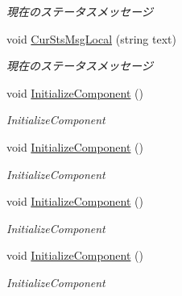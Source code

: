 \begin{DoxyCompactItemize}
\begin{DoxyCompactList}\small\item\em 現在のステータスメッセージ \end{DoxyCompactList}\item 
void \hyperlink{class_reversi_wpf_1_1_main_window_a73402ffecf2de584339327dce357bd60}{Cur\+Sts\+Msg\+Local} (string text)
\begin{DoxyCompactList}\small\item\em 現在のステータスメッセージ \end{DoxyCompactList}\item 
void \hyperlink{class_reversi_wpf_1_1_main_window_a4cf9bc92cee02fa8e3b00fa56fb41c82}{Initialize\+Component} ()
\begin{DoxyCompactList}\small\item\em Initialize\+Component \end{DoxyCompactList}\item 
void \hyperlink{class_reversi_wpf_1_1_main_window_a4cf9bc92cee02fa8e3b00fa56fb41c82}{Initialize\+Component} ()
\begin{DoxyCompactList}\small\item\em Initialize\+Component \end{DoxyCompactList}\item 
void \hyperlink{class_reversi_wpf_1_1_main_window_a4cf9bc92cee02fa8e3b00fa56fb41c82}{Initialize\+Component} ()
\begin{DoxyCompactList}\small\item\em Initialize\+Component \end{DoxyCompactList}\item 
void \hyperlink{class_reversi_wpf_1_1_main_window_a4cf9bc92cee02fa8e3b00fa56fb41c82}{Initialize\+Component} ()
\begin{DoxyCompactList}\small\item\em Initialize\+Component \end{DoxyCompactList}\end{DoxyCompactItemize}
